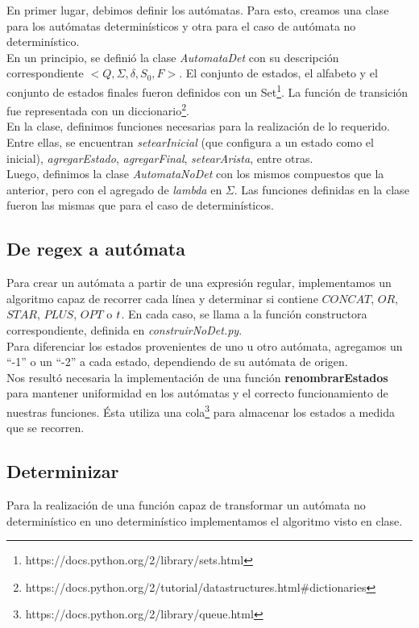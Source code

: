 \documentclass[a4paper, 10pt, twoside]{article}
\begin{document}
En primer lugar, debimos definir los autómatas. Para esto, creamos una clase para los autómatas determinísticos y otra para el caso de autómata no determinístico.\\
\newline
En un principio, se definió la clase \textit{AutomataDet} con su descripción correspondiente $<Q, \Sigma, \delta, S_0, F>$. El conjunto de estados, el alfabeto y el conjunto de estados finales fueron definidos con un Set\footnote{https://docs.python.org/2/library/sets.html}. La función de transición fue representada con un diccionario\footnote{https://docs.python.org/2/tutorial/datastructures.html\#dictionaries}.\\
En la clase, definimos funciones necesarias para la realización de lo requerido. Entre ellas, se encuentran \textit{setearInicial} (que configura a un estado como el inicial), \textit{agregarEstado}, \textit{agregarFinal}, \textit{setearArista}, entre otras.\\
\newline
Luego, definimos la clase \textit{AutomataNoDet} con los mismos compuestos que la anterior, pero con el agregado de \textit{lambda} en $\Sigma$. Las funciones definidas en la clase fueron las mismas que para el caso de determinísticos.

\subsection{De regex a autómata}
Para crear un autómata a partir de una expresión regular, implementamos un algoritmo capaz de recorrer cada línea y determinar si contiene ${CONCAT}$, ${OR}$, ${STAR}$, ${PLUS}$, ${OPT}$ o $\\t$. En cada caso, se llama a la función constructora correspondiente, definida en \textit{construirNoDet.py}.\\
\newline
Para diferenciar los estados provenientes de uno u otro autómata, agregamos un ``-1'' o un ``-2'' a cada estado, dependiendo de su autómata de origen.\\
\newline
Nos resultó necesaria la implementación de una función \textbf{renombrarEstados} para mantener uniformidad en los autómatas y el correcto funcionamiento de nuestras funciones. Ésta utiliza una cola\footnote{https://docs.python.org/2/library/queue.html} para almacenar los estados a medida que se recorren.

\subsection{Determinizar}
Para la realización de una función capaz de transformar un autómata no determinístico en uno determinístico implementamos el algoritmo visto en clase.
\end{document}
